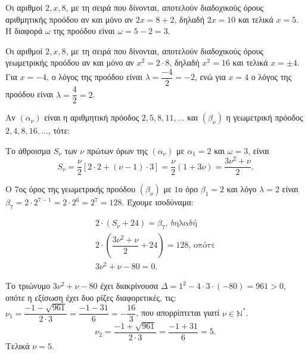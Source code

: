 
\begin{alist}
\item Οι αριθμοί $2, x, 8$, με τη σειρά που δίνονται, αποτελούν διαδοχικούς όρους αριθμητικής προόδου αν και μόνο αν $2x = 8 + 2$, δηλαδή $2x = 10$ και τελικά $x = 5$. Η διαφορά $\omega$ της προόδου είναι $\omega = 5 - 2 = 3$.

\item Οι αριθμοί $2, x, 8$, με τη σειρά που δίνονται, αποτελούν διαδοχικούς όρους γεωμετρικής προόδου αν και μόνο αν $x^2 = 2 \cdot 8$, δηλαδή $x^2 = 16$ και τελικά $x = \pm 4$.
Για $x = -4$, ο λόγος της προόδου είναι $\lambda = \dfrac{-4}{2} = -2$, ενώ για $x = 4$ ο λόγος της προόδου είναι $\lambda = \dfrac{4}{2} = 2$.

\item Αν $(\alpha_\nu)$ είναι η αριθμητική πρόοδος $2, 5, 8, 11, \dots$ και $(\beta_\nu)$ η γεωμετρική πρόοδος $2, 4, 8, 16, \dots$, τότε:
\begin{rlist}
\item Το άθροισμα $S_\nu$ των $\nu$ πρώτων όρων της $(\alpha_\nu)$ με $\alpha_1 = 2$ και $\omega = 3$, είναι
\[S_\nu = \dfrac{\nu}{2} \left[2 \cdot 2 + (\nu - 1) \cdot 3\right] = \dfrac{\nu}{2} (1 + 3\nu) = \dfrac{3\nu^2 + \nu}{2}.\]

\item Ο $7$ος όρος της γεωμετρικής προόδου $(\beta_\nu)$ με $1$ο όρο $\beta_1 = 2$ και λόγο $\lambda = 2$ είναι
$\beta_7 = 2 \cdot 2^{7-1} = 2 \cdot 2^6 = 2^7 = 128$. Έχουμε ισοδύναμα:

\begin{gather*}
2 \cdot (S_\nu + 24) = \beta_7\text{, δηλαδή} \\
2 \cdot \left(\dfrac{3\nu^2 + \nu}{2} + 24\right) = 128\text{, οπότε} \\
3\nu^2 + \nu - 80 = 0.
\end{gather*}

Το τριώνυμο $3\nu^2 + \nu - 80$ έχει διακρίνουσα $\Delta = 1^2 - 4 \cdot 3 \cdot (-80) = 961 > 0$, οπότε η εξίσωση έχει δυο ρίζες διαφορετικές, τις:
$\nu_1 = \dfrac{-1 - \sqrt{961}}{2 \cdot 3} = \dfrac{-1 - 31}{6} = -\dfrac{16}{3}$, που απορρίπτεται γιατί $\nu \in \mathbb{N}^*$.
\[\nu_2 = \dfrac{-1 + \sqrt{961}}{2 \cdot 3} = \dfrac{-1 + 31}{6} = 5.\]
Τελικά $\nu = 5$.
\end{rlist}
\end{alist}

